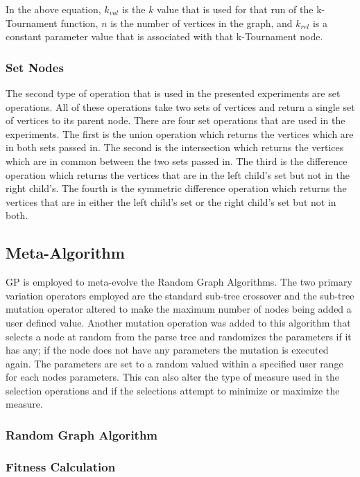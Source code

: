 \documentclass{article}
\begin{document}
In the above equation, $k_{val}$ is the $k$ value that is used for that run of the k-Tournament function, $n$ is the number of vertices in the graph, and $k_{rel}$
is a constant parameter value that is associated with that k-Tournament node.


\subsubsection{Set Nodes}

The second type of operation that is used in the presented experiments are set operations. All of these operations take two sets of vertices and return
a single set of vertices to its parent node. There are four set operations that are used in the experiments. The first is the union operation which returns
the vertices which are in both sets passed in. The second is the intersection which returns the vertices which are in common between the two sets passed in. 
The third is the difference operation which returns the vertices that are in the left child's set but not in the right child's. The fourth is the symmetric
difference operation which returns the vertices that are in either the left child's set or the right child's set but not in both. 


\subsection{Meta-Algorithm}
GP is employed to meta-evolve the Random Graph Algorithms. The two primary variation operators employed are the standard sub-tree crossover and the sub-tree
mutation operator altered to make the maximum number of nodes being added a user defined value. Another mutation operation was added to this algorithm that 
selects a node at random from the parse tree and randomizes the parameters if it has any; if the node does not have any parameters the mutation is executed again. 
The parameters are set to a random valued within a specified user range for each nodes parameters. This can also alter the type of measure used in the selection
operations and if the selections attempt to minimize or maximize the measure. 

\subsubsection{Random Graph Algorithm}


\subsubsection{Fitness Calculation}
\end{document}
